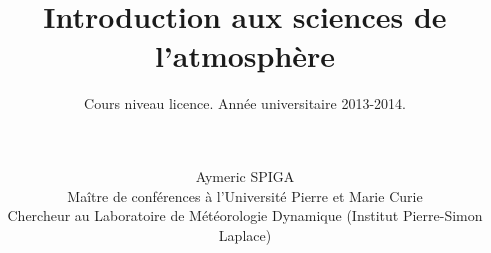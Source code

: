 \documentclass[
	a4paper,
	DIV16,
	10pt,
	cleardoublepage=empty,
        twoside=yes,
        BCOR=8.25mm
	]{scrbook}
\begin{document}
\frontmatter

\subject{LP211}
\title{Introduction aux sciences de l'atmosphère}
\subtitle{Cours niveau licence. Année universitaire 2013-2014.}
\author{~\\ ~\\
Aymeric SPIGA\\
\small Maître de conférences à l'Université Pierre et Marie Curie\\
\small Chercheur au Laboratoire de Météorologie Dynamique (Institut Pierre-Simon Laplace)
}
\date{}
\publishers{
\texttt{[image: /home/aymeric/Images/Logo/UPMC\_cart-blanc-Q\_7504-703-3.png]}\\
Contact: \\Copie et usage interdits sans autorisation explicite de l'auteur.
}

\dedication{Les chapitres 1, 2, 3, 4, 5, 6, 8 consistent en de multiples réorganisations, ajouts et modifications sur des notes existantes de Francis Codron et Sébastien Payan que je souhaite remercier pour leur aide. Les chapitres 7 et 9 sont entièrement originaux. Je remercie Jean-Baptiste Madeleine et Guillaume Angot pour leurs remarques constructives.\\ ~\\ ~\\ Dans l'éventualité où le lecteur trouverait des erreurs ou imprécisions dans ce cours, il est cordialement invité à les signaler à l'auteur à l'adresse \url{aymeric.spiga@upmc.fr}} \maketitle \tableofcontents

\mainmatter

%
\end{document}
